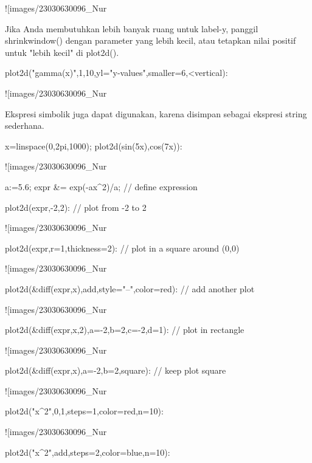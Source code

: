 \documentclass{article}
\begin{document}
![images/23030630096_Nur%

Jika Anda membutuhkan lebih banyak ruang untuk label-y, panggil
shrinkwindow() dengan parameter yang lebih kecil, atau tetapkan nilai
positif untuk "lebih kecil" di plot2d().


\>plot2d("gamma(x)",1,10,yl="y-values",smaller=6,<vertical):


![images/23030630096_Nur%

Ekspresi simbolik juga dapat digunakan, karena disimpan sebagai
ekspresi string sederhana.


\>x=linspace(0,2pi,1000); plot2d(sin(5x),cos(7x)):


![images/23030630096_Nur%

\>a:=5.6; expr &= exp(-a\*x^2)/a; // define expression

\>plot2d(expr,-2,2): // plot from -2 to 2


![images/23030630096_Nur%

\>plot2d(expr,r=1,thickness=2): // plot in a square around (0,0)


![images/23030630096_Nur%

\>plot2d(&diff(expr,x),\>add,style="--",color=red): // add another plot


![images/23030630096_Nur%

\>plot2d(&diff(expr,x,2),a=-2,b=2,c=-2,d=1): // plot in rectangle


![images/23030630096_Nur%

\>plot2d(&diff(expr,x),a=-2,b=2,\>square): // keep plot square


![images/23030630096_Nur%

\>plot2d("x^2",0,1,steps=1,color=red,n=10):


![images/23030630096_Nur%

\>plot2d("x^2",\>add,steps=2,color=blue,n=10):
\end{document}
